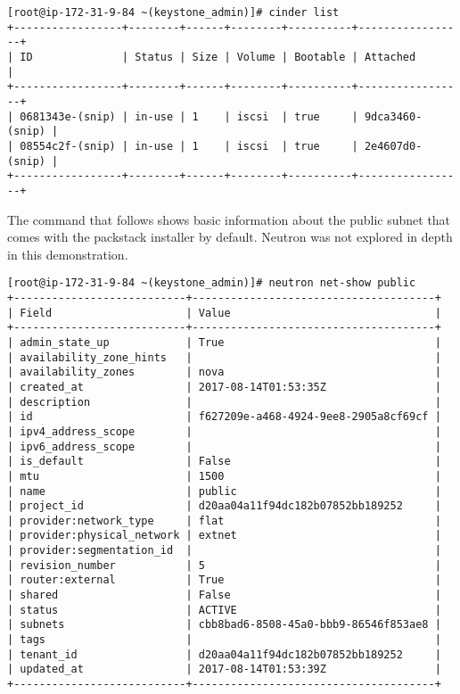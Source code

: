 \begin{verbatim}
[root@ip-172-31-9-84 ~(keystone_admin)]# cinder list
+-----------------+--------+------+--------+----------+-----------------+
| ID              | Status | Size | Volume | Bootable | Attached        |
+-----------------+--------+------+--------+----------+-----------------+
| 0681343e-(snip) | in-use | 1    | iscsi  | true     | 9dca3460-(snip) |
| 08554c2f-(snip) | in-use | 1    | iscsi  | true     | 2e4607d0-(snip) |
+-----------------+--------+------+--------+----------+-----------------+
\end{verbatim}

The command that follows shows basic information about the public
subnet that comes with the packstack installer by default. Neutron was not
explored in depth in this demonstration.

\begin{verbatim}
[root@ip-172-31-9-84 ~(keystone_admin)]# neutron net-show public
+---------------------------+--------------------------------------+
| Field                     | Value                                |
+---------------------------+--------------------------------------+
| admin_state_up            | True                                 |
| availability_zone_hints   |                                      |
| availability_zones        | nova                                 |
| created_at                | 2017-08-14T01:53:35Z                 |
| description               |                                      |
| id                        | f627209e-a468-4924-9ee8-2905a8cf69cf |
| ipv4_address_scope        |                                      |
| ipv6_address_scope        |                                      |
| is_default                | False                                |
| mtu                       | 1500                                 |
| name                      | public                               |
| project_id                | d20aa04a11f94dc182b07852bb189252     |
| provider:network_type     | flat                                 |
| provider:physical_network | extnet                               |
| provider:segmentation_id  |                                      |
| revision_number           | 5                                    |
| router:external           | True                                 |
| shared                    | False                                |
| status                    | ACTIVE                               |
| subnets                   | cbb8bad6-8508-45a0-bbb9-86546f853ae8 |
| tags                      |                                      |
| tenant_id                 | d20aa04a11f94dc182b07852bb189252     |
| updated_at                | 2017-08-14T01:53:39Z                 |
+---------------------------+--------------------------------------+
\end{verbatim}
